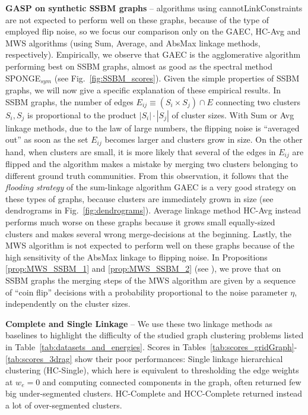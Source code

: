 \textbf{GASP on synthetic SSBM graphs}  -- 
\algname{} algorithms using cannotLinkConstraints are not expected to perform well on these graphs, because of the type of employed flip noise, so we focus our comparison only on the GAEC, HC-Avg and MWS algorithms (using Sum, Average, and AbsMax linkage methods, respectively).
Empirically, we observe that GAEC is the agglomerative algorithm performing best on SSBM graphs, almost as good as the spectral method SPONGE$_{sym}$ (see Fig.~\ref{fig:SSBM_scores}). Given the simple properties of SSBM graphs, we will now give a specific explanation of these empirical results. 
In SSBM graphs, the number of edges $E_{ij}\equiv(S_i\times S_j)\cap E$ connecting two clusters $S_i,S_j$ is  proportional to the product $|S_i|\cdot|S_j|$ of cluster sizes. 
With Sum or Avg linkage methods, due to the law of large numbers, the flipping noise is ``averaged out'' as soon as the set $E_{ij}$ becomes larger and clusters grow in size.
On the other hand, when clusters are small, it is more likely that several of the edges in $E_{ij}$ are flipped and the algorithm makes a mistake by merging two clusters belonging to different ground truth communities. From this observation, it follows that the \emph{flooding strategy} of the sum-linkage algorithm GAEC is a very good strategy on these types of graphs, because clusters are immediately grown in size (see dendrograms in Fig.~\ref{fig:dendrograms}). Average linkage method HC-Avg instead performs much worse on these graphs because it grows small equally-sized clusters and makes several wrong merge-decisions at the beginning. 
Lastly, the MWS algorithm is not expected to perform well on these graphs because of the high sensitivity of the AbsMax linkage to flipping noise. In Propositions \ref{prop:MWS_SSBM_1} and \ref{prop:MWS_SSBM_2} (see ), we prove that on SSBM graphs the merging steps of the MWS algorithm are given by a sequence of ``coin flip'' decisions with a probability proportional to the noise parameter $\eta$, independently on the cluster sizes.

\textbf{Complete and Single Linkage} -- We use these two linkage methods as baselines to highlight the difficulty of the studied graph clustering problems listed in Table~\ref{tab:datasets_and_energies}. Scores in Tables~\ref{tab:scores_gridGraph}-\ref{tab:scores_3drag} show their poor performances: Single linkage hierarchical clustering (HC-Single), which here is equivalent to thresholding the edge weights at $w_e=0$ and computing connected components in the graph, often returned few big under-segmented clusters. HC-Complete and HCC-Complete returned instead a lot of over-segmented clusters. 




